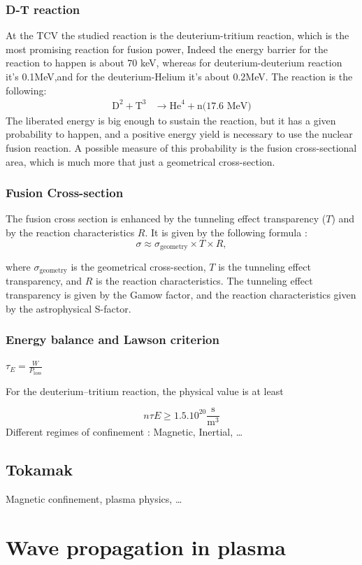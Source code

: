 \documentclass[11pt,a4paper]{report}
\begin{document}
\begin{multicols}{2}
    \subsubsection{D-T reaction}
    At the TCV the studied reaction is the deuterium-tritium reaction, which is the most promising reaction for fusion power, Indeed the energy barrier for the reaction to happen is about $70$ keV, whereas for deuterium-deuterium reaction it's $0.$1MeV,and for the deuterium-Helium it's about $0.2$MeV. The reaction is the following:
    \begin{align*}
        \text{D}^2 + \text{T}^3 & \rightarrow \text{He}^4 + \text{n(17.6 MeV)}
    \end{align*}
    The liberated energy is big enough to sustain the reaction, but it has a given probability to happen, and a positive energy yield is necessary to use the nuclear fusion reaction.
    A possible measure of this probability is the fusion cross-sectional area, which is much more that just a geometrical cross-section.
    \subsubsection{Fusion Cross-section}
    The fusion cross section is enhanced by the tunneling effect transparency ($T$) and by the reaction characteristics $R$. It is given by the following formula :
    $$\sigma \approx \sigma _{\text{geometry}}\times T\times R,$$

    where $\sigma _{\text{geometry}}$ is the geometrical cross-section, $T$ is the tunneling effect transparency, and $R$ is the reaction characteristics. The tunneling effect transparency is given by the Gamow factor, and the reaction characteristics given by the astrophysical S-factor.
    \subsubsection{Energy balance and Lawson criterion}
    $ \tau _{E}={\frac {W}{P_{\mathrm {loss} }}}$

    For the deuterium–tritium reaction, the physical value is at least

    $$n \tau E \ge 1.5.10^{20}{\frac {\mathrm {s} }{\mathrm {m} ^{3}}}$$
    Different regimes of confinement : Magnetic, Inertial, \dots
    \subsection{Tokamak}
    Magnetic confinement, plasma physics, \dots
    \section{Wave propagation in plasma}

\end{multicols}
\end{document}
